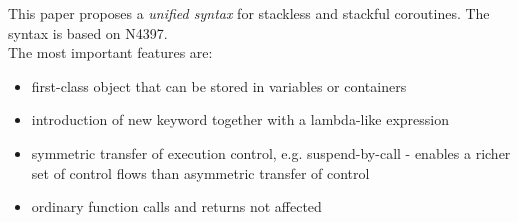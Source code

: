 This paper proposes a \emph{unified syntax} for stackless and stackful
coroutines. The syntax is based on N4397\cite{N4397}.\\
\newline
The most important features are:
\begin{itemize}
    \item first-class object that can be stored in variables or containers
    \item introduction of new keyword \resumable together with a lambda-like
          expression
    \item symmetric transfer of execution control, e.g. suspend-by-call -
          enables a richer set of control flows than asymmetric transfer of
          control
    \item ordinary function calls and returns not affected
\end{itemize}
